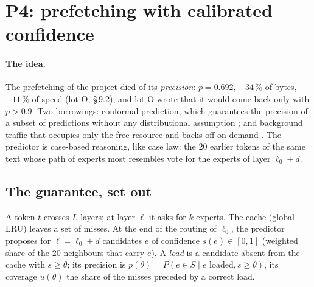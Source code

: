 \section{P4: prefetching with calibrated confidence}\label{t3mim:sec:p4}

\paragraph{The idea.} The prefetching of the project died of its \emph{precision}: $p = 0.692$, $+34\,\%$ of bytes, $-11\,\%$ of speed (lot O, §\,9.2), and lot O wrote that it would come back only with $p > 0.9$. Two borrowings: conformal prediction, which guarantees the precision of a subset of predictions without any distributional assumption \cite{angelopoulos2021gentle,angelopoulos2021ltt}; and background traffic that occupies only the free resource and backs off on demand \cite{shalunov2012ledbat}. The predictor is case-based reasoning, like case law: the 20 earlier tokens of the same text whose path of experts most resembles vote for the experts of layer $\ell_0 + d$.

\subsection{The guarantee, set out}\label{t3mim:sec:p4-garantie}

A token $t$ crosses $L$ layers; at layer $\ell$ it asks for $k$ experts. The cache (global LRU) leaves a set of misses. At the end of the routing of $\ell_0$, the predictor proposes for $\ell = \ell_0 + d$ candidates $e$ of confidence $s(e) \in [0, 1]$ (weighted share of the 20 neighbours that carry $e$). A \emph{load} is a candidate absent from the cache with $s \ge \theta$; its precision is $p(\theta) = P(e \in S \mid e \text{ loaded}, s \ge \theta)$, its coverage $u(\theta)$ the share of the misses preceded by a correct load.

